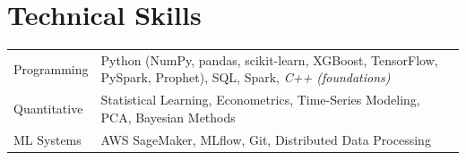 \documentclass[9pt]{article}
\begin{document}
    \section{Technical Skills}
    \begin{tabularx}{\linewidth}{@{}l X@{}}
    
    Programming & Python (NumPy, pandas, scikit-learn, XGBoost, TensorFlow, PySpark, Prophet), SQL, Spark, \textit{C++ (foundations)} \\
    
    Quantitative & Statistical Learning, Econometrics, Time-Series Modeling, PCA, Bayesian Methods \\
    
    ML Systems & AWS SageMaker, MLflow, Git, Distributed Data Processing \\
    
    \end{tabularx}
    
    
\end{document}
